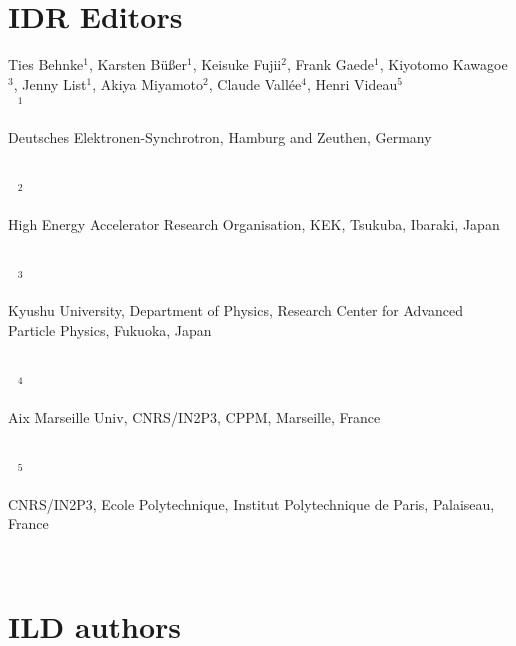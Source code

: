 \newpage\thispagestyle{empty}
\cleardoublepage
\newcommand{\IDRinst}[2]{\noindent  $^{\;\;\:\:#1}$\begin{minipage}[t]{0.95\textwidth}{#2}\end{minipage}\\}
\newcommand{\IDRauth}[2]{\noindent {#2}$^{#1}$,}
\newcommand{\IDRauthl}[2]{\noindent {#2}$^{#1}$}

\chapter*{IDR Editors}

Ties Behnke$^1$, Karsten B\"u{\ss}er$^1$, Keisuke Fujii$^2$, Frank Gaede$^1$, Kiyotomo Kawagoe$^3$, Jenny List$^1$, Akiya Miyamoto$^2$, Claude Vall\'ee$^4$, Henri Videau$^5$ \\

\vspace{5mm}
\IDRinst{1}{Deutsches Elektronen-Synchrotron, Hamburg and Zeuthen, Germany}
\IDRinst{2}{High Energy Accelerator Research Organisation, KEK, Tsukuba, Ibaraki, Japan}
\IDRinst{3}{Kyushu University, Department of Physics, Research Center for Advanced Particle Physics, Fukuoka, Japan}
\IDRinst{4}{Aix Marseille Univ, CNRS/IN2P3, CPPM, Marseille, France}
\IDRinst{5}{CNRS/IN2P3, Ecole Polytechnique, Institut Polytechnique de Paris, Palaiseau, France}


\chapter*{ ILD authors}





